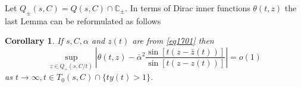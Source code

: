 \documentclass[11pt,twoside,reqno]{amsart}
\def\to{\rightarrow}
\def\R{{\mathbb R}}
\def\C{{\mathbb{C}}}
\def\e{\varepsilon}
\def\d{\delta}
\def\a{\alpha}
\theoremstyle{plain}
\newtheorem{corollary}{Corollary}
\newtheorem{remark}{Remark}
\numberwithin{equation}{section}
\begin{document}
Let $Q_\pm(s,C)=Q(s,C)\cap \C_{\pm}$. In terms of Dirac inner functions $\theta(t,z)$ the last Lemma can
be reformulated as follows

\begin{corollary}\label{cortheta}
If $s, C,\a$ and $z(t)$ are from \eqref{eq1701} then
\begin{equation}\sup_{z\in Q_+(s,C/t)}\left|\theta(t,z)-\bar\a^2\frac{\sin [t(z-\bar z(t))]}{\sin [t(z-z(t))]}\right|=o(1)
\label{eqTheta}\end{equation}
as $t\to\infty, t\in T_0(s,C)\cap \{ty(t)>1\}$.

\end{corollary}

%
%
%
%
%
%
%
\end{document}
